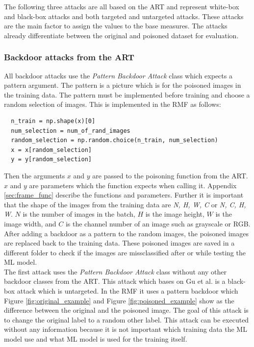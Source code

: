 The following three attacks are all based on the ART \cite{art2018} and represent white-box and black-box attacks and both targeted and untargeted attacks. These attacks are the main factor to assign the values to the base measures. The attacks already differentiate between the original and poisoned dataset for evaluation.

\subsubsection*{Backdoor attacks from the ART}
\label{sec:backdoors_art}

All backdoor attacks use the \textit{Pattern Backdoor Attack} \cite{DBLP:journals/corr/abs-1708-06733} class which expects a pattern argument. The pattern is a picture which is for the poisoned images in the training data. The pattern must be implemented before training and choose a random selection of images. This is implemented in the RMF as follows:

\begin{lstlisting}
  n_train = np.shape(x)[0]
  num_selection = num_of_rand_images
  random_selection = np.random.choice(n_train, num_selection)
  x = x[random_selection]
  y = y[random_selection]
\end{lstlisting}

Then the arguments $x$ and $y$ are passed to the poisoning function from the ART. $x$ and $y$ are parameters which the function expects when calling it. Appendix \ref{sec:frame_func}
describe the functions and parameters. Further it is important that the shape of the images from the training data are \textit{N, H, W, C} or \textit{N, C, H, W}. $N$ is the number of
images in the batch, $H$ is the image height, $W$ is the image width, and $C$ is the channel number of an image such as grayscale or RGB. After adding a backdoor as a pattern to the
random images, the poisoned images are replaced back to the training data. These poisoned images are saved in a different folder to check if the images are missclassified after or while
testing the ML model.\\


The first attack uses the \textit{Pattern Backdoor Attack} class without any other backdoor classes from the ART. This attack which bases on Gu et al. \cite{DBLP:journals/corr/abs-1708-
06733} is a black-box attack which is untargeted. In the RMF it uses a pattern backdoor which Figure \ref{fig:original_example} and Figure \ref{fig:poisoned_example} show as the
difference between the original and the poisoned image. The goal of this attack is to change the original label to a random other label. This attack can be executed without any
information because it is not important which training data the ML model use and what ML model is used for the training itself.

